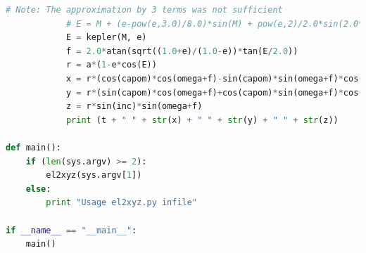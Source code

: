 \documentclass[A4paper, 12pt, oneside]{book}
\begin{document}
\begin{appendices}
\begin{lstlisting}[language=Python]
            # Note: The approximation by 3 terms was not sufficient
            # E = M + (e-pow(e,3.0)/8.0)*sin(M) + pow(e,2)/2.0*sin(2.0*M) + pow(e,3)*3.0/8.0*sin(3.0*M)
            E = kepler(M, e)
            f = 2.0*atan(sqrt((1.0+e)/(1.0-e))*tan(E/2.0))
            r = a*(1-e*cos(E))
            x = r*(cos(capom)*cos(omega+f)-sin(capom)*sin(omega+f)*cos(inc))
            y = r*(sin(capom)*cos(omega+f)+cos(capom)*sin(omega+f)*cos(inc))
            z = r*sin(inc)*sin(omega+f)
            print (t + " " + str(x) + " " + str(y) + " " + str(z))

def main():
    if (len(sys.argv) >= 2):
        el2xyz(sys.argv[1])
    else:
        print "Usage el2xyz.py infile"

if __name__ == "__main__":
    main()
	\end{lstlisting}
\end{appendices}
\end{document}
